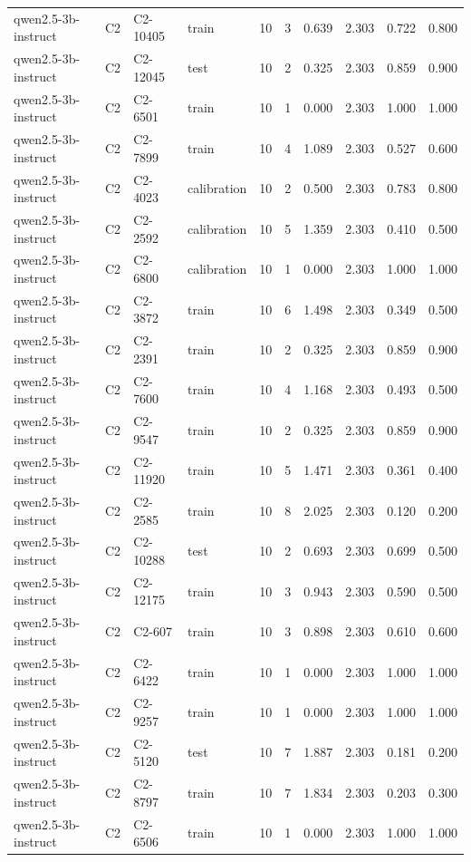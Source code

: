 \begin{table}
\begin{tabular}{llllrrrrrr}
qwen2.5-3b-instruct & C2 & C2-10405 & train & 10 & 3 & 0.639 & 2.303 & 0.722 & 0.800 \\
qwen2.5-3b-instruct & C2 & C2-12045 & test & 10 & 2 & 0.325 & 2.303 & 0.859 & 0.900 \\
qwen2.5-3b-instruct & C2 & C2-6501 & train & 10 & 1 & 0.000 & 2.303 & 1.000 & 1.000 \\
qwen2.5-3b-instruct & C2 & C2-7899 & train & 10 & 4 & 1.089 & 2.303 & 0.527 & 0.600 \\
qwen2.5-3b-instruct & C2 & C2-4023 & calibration & 10 & 2 & 0.500 & 2.303 & 0.783 & 0.800 \\
qwen2.5-3b-instruct & C2 & C2-2592 & calibration & 10 & 5 & 1.359 & 2.303 & 0.410 & 0.500 \\
qwen2.5-3b-instruct & C2 & C2-6800 & calibration & 10 & 1 & 0.000 & 2.303 & 1.000 & 1.000 \\
qwen2.5-3b-instruct & C2 & C2-3872 & train & 10 & 6 & 1.498 & 2.303 & 0.349 & 0.500 \\
qwen2.5-3b-instruct & C2 & C2-2391 & train & 10 & 2 & 0.325 & 2.303 & 0.859 & 0.900 \\
qwen2.5-3b-instruct & C2 & C2-7600 & train & 10 & 4 & 1.168 & 2.303 & 0.493 & 0.500 \\
qwen2.5-3b-instruct & C2 & C2-9547 & train & 10 & 2 & 0.325 & 2.303 & 0.859 & 0.900 \\
qwen2.5-3b-instruct & C2 & C2-11920 & train & 10 & 5 & 1.471 & 2.303 & 0.361 & 0.400 \\
qwen2.5-3b-instruct & C2 & C2-2585 & train & 10 & 8 & 2.025 & 2.303 & 0.120 & 0.200 \\
qwen2.5-3b-instruct & C2 & C2-10288 & test & 10 & 2 & 0.693 & 2.303 & 0.699 & 0.500 \\
qwen2.5-3b-instruct & C2 & C2-12175 & train & 10 & 3 & 0.943 & 2.303 & 0.590 & 0.500 \\
qwen2.5-3b-instruct & C2 & C2-607 & train & 10 & 3 & 0.898 & 2.303 & 0.610 & 0.600 \\
qwen2.5-3b-instruct & C2 & C2-6422 & train & 10 & 1 & 0.000 & 2.303 & 1.000 & 1.000 \\
qwen2.5-3b-instruct & C2 & C2-9257 & train & 10 & 1 & 0.000 & 2.303 & 1.000 & 1.000 \\
qwen2.5-3b-instruct & C2 & C2-5120 & test & 10 & 7 & 1.887 & 2.303 & 0.181 & 0.200 \\
qwen2.5-3b-instruct & C2 & C2-8797 & train & 10 & 7 & 1.834 & 2.303 & 0.203 & 0.300 \\
qwen2.5-3b-instruct & C2 & C2-6506 & train & 10 & 1 & 0.000 & 2.303 & 1.000 & 1.000 \\

\end{tabular}
\end{table}
